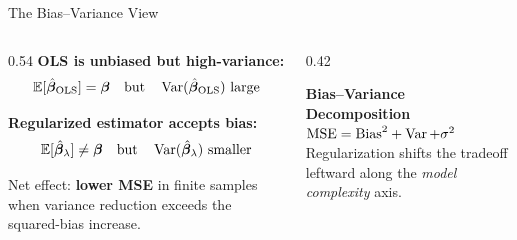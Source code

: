 \documentclass[aspectratio=169, 10pt]{beamer}
\begin{document}
\begin{frame}{The Bias--Variance View}
  \begin{columns}[T]
    \begin{column}{0.54\textwidth}
      \textbf{OLS is unbiased but high-variance:}
      \[
        \mathbb{E}[\hat{\bm{\beta}}_{\mathrm{OLS}}] = \bm{\beta}
        \quad \text{but} \quad
        \operatorname{Var}(\hat{\bm{\beta}}_{\mathrm{OLS}}) \text{ large}
      \]

      \textbf{Regularized estimator accepts bias:}
      \[
        \mathbb{E}[\hat{\bm{\beta}}_{\lambda}] \neq \bm{\beta}
        \quad \text{but} \quad
        \operatorname{Var}(\hat{\bm{\beta}}_{\lambda}) \text{ smaller}
      \]

      \medskip
      Net effect: \textbf{lower MSE} in finite samples when
      variance reduction exceeds the squared-bias increase.
    \end{column}
    \begin{column}{0.42\textwidth}
      \begin{keybox}
        \textbf{Bias--Variance Decomposition}\\[4pt]
        $\operatorname{MSE} = \mathrm{Bias}^2 + \operatorname{Var} + \sigma^2$\\[4pt]
        Regularization shifts the tradeoff leftward along the \emph{model complexity} axis.
      \end{keybox}
    \end{column}
  \end{columns}
\end{frame}
\end{document}
